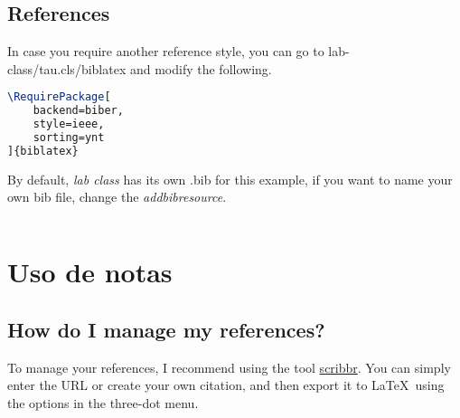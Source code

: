 \documentclass[9pt,a4paper,twocolumn,twoside]{lab-class/lab}
\begin{document}

    \printbibliography[heading=bibintoc]
    
\clearpage

		
    \subsection{References}
		
        In case you require another reference style, you can go to lab-class/tau.cls/biblatex and modify the following.
		
\begin{lstlisting}[language=TeX, caption=References style.]
\RequirePackage[
	backend=biber,
	style=ieee,
	sorting=ynt
]{biblatex}
\end{lstlisting}

        By default, \textit{lab class} has its own .bib for this example, if you want to name your own bib file, change the \textit{addbibresource}.
		
\begin{lstlisting}[language=TeX]

\end{lstlisting}

\section{Uso de notas}

    \subsection*{How do I manage my references?}
        
        To manage your references, I recommend using the tool \href{https://www.scribbr.es/citar/generador/folders/73QOXYsCwMRu4ifQaN65mx/lists/msTfx7GJjIAOUkufbISnA/}{scribbr}. You can simply enter the URL or create your own citation, and then export it to \LaTeX\ using the options in the three-dot menu.
            
\end{document}
